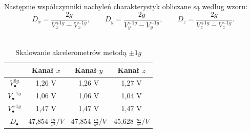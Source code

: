 \documentclass[a4paper,12pt]{article}
\begin{document}
Następnie współczynniki nachyleń charakterystyk obliczane są według wzoru:
\[
D_x = \frac{2g}{V_{x}^{+1g} - V_{x}^{-1g}}, \qquad
D_y = \frac{2g}{V_{y}^{+1g} - V_{y}^{-1g}}, \qquad
D_z = \frac{2g}{V_{z}^{+1g} - V_{z}^{-1g}}.
\]\

\begin{table}[h]
\centering
\begin{tabular}{|c|c|c|c|}
\hline
 & Kanał $x$ & Kanał $y$ & Kanał $z$ \\ \hline
$V_{\bullet}^{0g}$ & 1,26 V & 1,26 V & 1,27 V \\ \hline
$V_{\bullet}^{-1g}$ & 1,06 V & 1,06 V & 1,04 V \\ \hline
$V_{\bullet}^{+1g}$ & 1,47 V & 1,47 V & 1,47 V \\ \hline
$D_{\bullet}$ & 47,854 $\frac{m}{s^2}/V$ & 47,854 $\frac{m}{s^2}/V$ & 45,628 $\frac{m}{s^2}/V$ \\ \hline
\end{tabular}
\caption{Skalowanie akcelerometrów metodą $\pm 1g$}
\end{table}


\newpage
\end{document}
